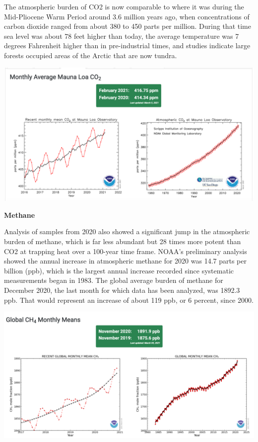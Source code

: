 \documentclass[
]{book}
\begin{document}
The atmospheric burden of CO2 is now comparable to where it was during the Mid-Pliocene Warm Period around 3.6 million years ago, when concentrations of carbon dioxide ranged from about 380 to 450 parts per million. During that time sea level was about 78 feet higher than today, the average temperature was 7 degrees Fahrenheit higher than in pre-industrial times, and studies indicate large forests occupied areas of the Arctic that are now tundra.

\includegraphics{fig/monthly-avg-co2-mlo.png}

\textbf{Methane}

Analysis of samples from 2020 also showed a significant jump in the atmospheric burden of methane, which is far less abundant but 28 times more potent than CO2 at trapping heat over a 100-year time frame. NOAA's preliminary analysis showed the annual increase in atmospheric methane for 2020 was 14.7 parts per billion (ppb), which is the largest annual increase recorded since systematic measurements began in 1983. The global average burden of methane for December 2020, the last month for which data has been analyzed, was 1892.3 ppb. That would represent an increase of about 119 ppb, or 6 percent, since 2000.

\includegraphics{fig/2020-global-ch4.png}
\end{document}
